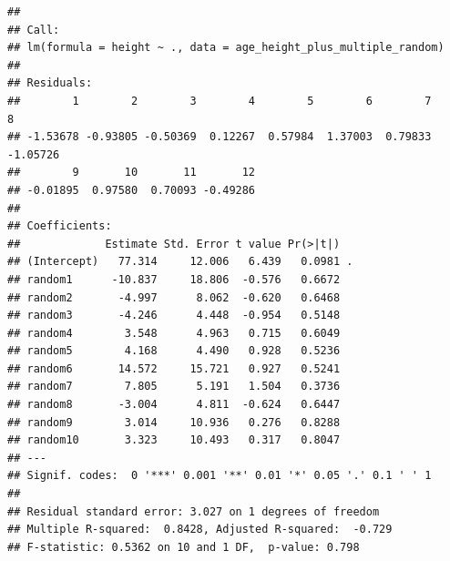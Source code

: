 \documentclass[
]{article}
\begin{document}
\begin{verbatim}
## 
## Call:
## lm(formula = height ~ ., data = age_height_plus_multiple_random)
## 
## Residuals:
##        1        2        3        4        5        6        7        8 
## -1.53678 -0.93805 -0.50369  0.12267  0.57984  1.37003  0.79833 -1.05726 
##        9       10       11       12 
## -0.01895  0.97580  0.70093 -0.49286 
## 
## Coefficients:
##             Estimate Std. Error t value Pr(>|t|)  
## (Intercept)   77.314     12.006   6.439   0.0981 .
## random1      -10.837     18.806  -0.576   0.6672  
## random2       -4.997      8.062  -0.620   0.6468  
## random3       -4.246      4.448  -0.954   0.5148  
## random4        3.548      4.963   0.715   0.6049  
## random5        4.168      4.490   0.928   0.5236  
## random6       14.572     15.721   0.927   0.5241  
## random7        7.805      5.191   1.504   0.3736  
## random8       -3.004      4.811  -0.624   0.6447  
## random9        3.014     10.936   0.276   0.8288  
## random10       3.323     10.493   0.317   0.8047  
## ---
## Signif. codes:  0 '***' 0.001 '**' 0.01 '*' 0.05 '.' 0.1 ' ' 1
## 
## Residual standard error: 3.027 on 1 degrees of freedom
## Multiple R-squared:  0.8428, Adjusted R-squared:  -0.729 
## F-statistic: 0.5362 on 10 and 1 DF,  p-value: 0.798
\end{verbatim}
\end{document}

